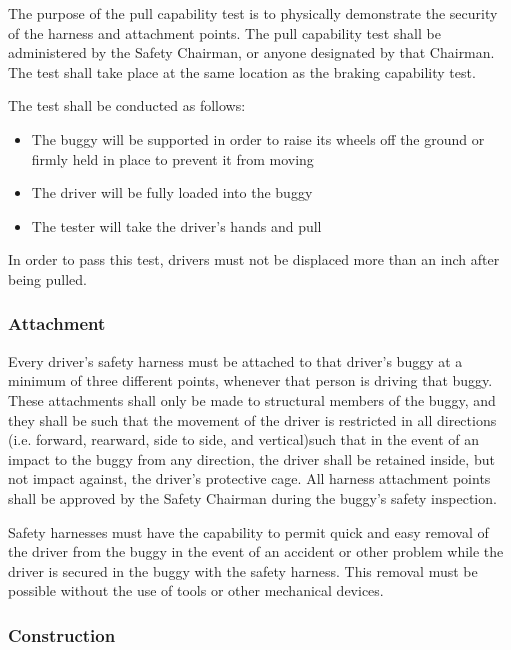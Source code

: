 	The purpose of the pull capability test is to physically demonstrate the security of the harness and attachment points. The pull capability test shall be administered by the Safety Chairman, or anyone designated by that Chairman. The test shall take place at the same location as the braking capability test. 

	The test shall be conducted as follows: 
	\begin{itemize}
		\item
		The buggy will be supported in order to raise its wheels off the ground or firmly held in place to prevent it from moving

		\item
		The driver will be fully loaded into the buggy
	
		\item
		The tester will take the driver's hands and pull		
	\end{itemize}

	In order to pass this test, drivers must not be displaced more than an inch after being pulled. 


\subsubsection{Attachment}

	Every driver's safety harness must be attached to that driver's buggy at a minimum of three different points, whenever that person is driving that buggy. These attachments shall only be made to structural members of the buggy, and they shall be such that the movement of the driver is restricted in all directions (i.e. forward, rearward, side to side, and vertical)such that in the event of an impact to the buggy from any direction, the driver shall be retained inside, but not impact against, the driver's protective cage. All harness attachment points shall be approved by the Safety Chairman during the buggy's safety inspection.
	
	Safety harnesses must have the capability to permit quick and easy removal of the driver from the buggy in the event of an accident or other problem while the driver is secured in the buggy with the safety harness. This removal must be possible without the use of tools or other mechanical devices.

\subsubsection{Construction}

